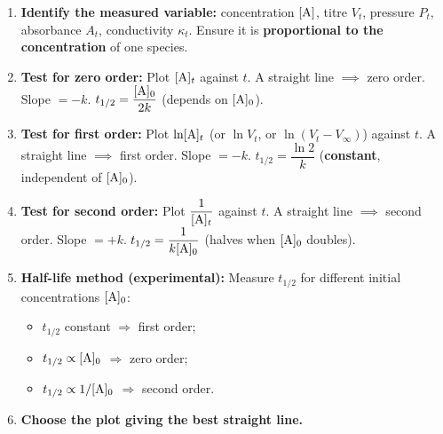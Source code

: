 \documentclass[11pt]{article}
\begin{document}
\begin{methode}
\begin{enumerate}
\item \textbf{Identify the measured variable:} concentration $[\ce{A}]$, titre $V_t$, pressure $P_t$, absorbance $A_t$, conductivity $\kappa_t$. Ensure it is \textbf{proportional to the concentration} of one species.
\item \textbf{Test for zero order:} Plot $[\ce{A}]_t$ against $t$. A straight line $\implies$ zero order. Slope $= -k$. $t_{1/2} = \dfrac{[\ce{A}]_0}{2k}$ (depends on $[\ce{A}]_0$).
\item \textbf{Test for first order:} Plot $\ln[\ce{A}]_t$ (or $\ln V_t$, or $\ln(V_t - V_\infty)$) against $t$. A straight line $\implies$ first order. Slope $= -k$. $t_{1/2} = \dfrac{\ln 2}{k}$ (\textbf{constant}, independent of $[\ce{A}]_0$).
\item \textbf{Test for second order:} Plot $\dfrac{1}{[\ce{A}]_t}$ against $t$. A straight line $\implies$ second order. Slope $= +k$. $t_{1/2} = \dfrac{1}{k[\ce{A}]_0}$ (halves when $[\ce{A}]_0$ doubles).
\item \textbf{Half-life method (experimental):} Measure $t_{1/2}$ for different initial concentrations $[\ce{A}]_0$:
    \begin{itemize}
    \item $t_{1/2}$ constant $\Rightarrow$ first order;
    \item $t_{1/2} \propto [\ce{A}]_0$ $\Rightarrow$ zero order;
    \item $t_{1/2} \propto 1/[\ce{A}]_0$ $\Rightarrow$ second order.
    \end{itemize}
\item \textbf{Choose the plot giving the best straight line.}
\end{enumerate}
\end{methode}
\end{document}
